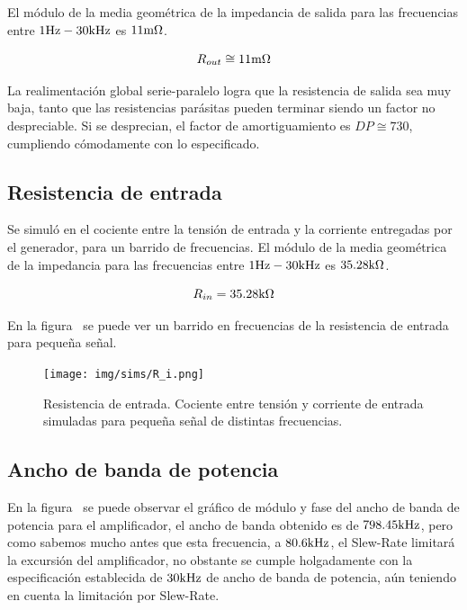 El módulo de la media geométrica de la impedancia de salida para las frecuencias entre $1 \si[per-mode=symbol]{\hertz}-30 \si[per-mode=symbol]{\kilo\hertz}$ es $11 \si[per-mode=symbol]{\milli\ohm}$.

\[ R_{out}\cong 11 \si[per-mode=symbol]{\milli\ohm}\]

La realimentación global serie-paralelo logra que la resistencia de salida sea muy baja, tanto que las resistencias parásitas pueden terminar siendo un factor no despreciable. Si se desprecian, el factor de amortiguamiento es  $DP \cong 730$, cumpliendo cómodamente con lo especificado.



\subsection{Resistencia de entrada}

Se simuló en el cociente entre la tensión de entrada y la corriente entregadas por el generador, para un barrido de frecuencias. El módulo de la media geométrica de la impedancia para las frecuencias entre $1 \si[per-mode=symbol]{\hertz}-30 \si[per-mode=symbol]{\kilo\hertz}$ es $35.28 \si[per-mode=symbol]{\kilo\ohm}$.

\[ R_{in}=35.28 \si[per-mode=symbol]{\kilo\ohm} \]

En la figura~ se puede ver un barrido en frecuencias de la resistencia de entrada para pequeña señal.


\begin{figure}[H]
	\centering
	\texttt{[image: img/sims/R\_i.png]}
	\caption{Resistencia de entrada. Cociente entre tensión y corriente de entrada simuladas para pequeña señal de distintas frecuencias.}
	\label{fig:R_i}
\end{figure}



\subsection{Ancho de banda de potencia}


En la figura~ se puede observar el gráfico de módulo y fase del ancho de banda de potencia para el amplificador, el ancho de banda obtenido es de $798.45 \si[per-mode=symbol]{\kilo\hertz}$, pero como sabemos mucho antes que esta frecuencia, a $80.6 \si[per-mode=symbol]{\kilo\hertz}$, el Slew-Rate limitará la excursión del amplificador, no obstante se cumple holgadamente con la especificación establecida de  $30 \si[per-mode=symbol]{\kilo\hertz}$ de ancho de banda de potencia, aún teniendo en cuenta la limitación por Slew-Rate.


